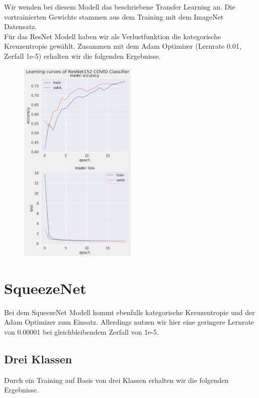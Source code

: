 Wir wenden bei diesem Modell das beschriebene Transfer Learning an. Die vortrainierten Gewichte stammen aus dem Training mit dem ImageNet Datensatz.\\
Für das ResNet Modell haben wir als Verlustfunktion die kategorische Kreuzentropie gewählt. Zusammen mit dem Adam Optimizer (Lernrate 0.01, Zerfall 1e-5) erhalten wir die folgenden Ergebnisse.

\begin{figure}[H]
    \centering
    \includegraphics[width=0.5\textwidth]{../results/ResNet152_curves.png}
    \caption{}
\end{figure}

\pagebreak

\section{SqueezeNet}

Bei dem SqueezeNet Modell kommt ebenfalls kategorische Kreuzentropie und der Adam Optimizer zum Einsatz. Allerdings nutzen wir hier eine geringere Lernrate von 0.00001 bei gleichbleibendem Zerfall von 1e-5.

\subsection{Drei Klassen}

Durch ein Training auf Basis von drei Klassen erhalten wir die folgenden Ergebnisse.

